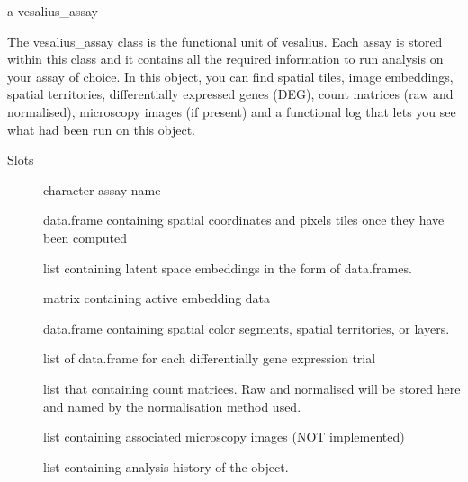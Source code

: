 \documentclass[a4paper]{book}
\begin{document}
%
\begin{Value}
a vesalius\_assay
\end{Value}
%
\begin{Description}
The vesalius\_assay class is the functional unit of vesalius. Each assay is
stored within this class and it contains all the required information to
run analysis on your assay of choice. In this object, you can find spatial
tiles, image embeddings, spatial territories, differentially expressed genes
(DEG), count matrices (raw and normalised), microscopy images (if present)
and a functional log that lets you see what had been run on this object.
\end{Description}
%
\begin{Section}{Slots}

\begin{description}

\item[] character assay name

\item[] data.frame containing spatial coordinates and pixels tiles once
they have been computed

\item[] list containing latent space embeddings in the form of
data.frames.

\item[] matrix containing active embedding data

\item[] data.frame containing spatial color segments, spatial
territories, or layers.

\item[] list of data.frame for each differentially gene expression trial

\item[] list that containing count matrices. Raw and normalised will
be stored here and named by the normalisation method used.

\item[] list containing associated microscopy images (NOT implemented)

\item[] list containing analysis history of the object.

\end{description}
\end{Section}
\end{document}
